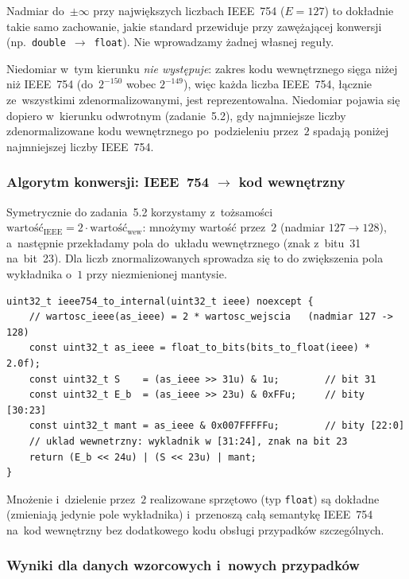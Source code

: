 \documentclass[12pt,a4paper]{article}
\begin{document}
Nadmiar do~$\pm\infty$ przy największych liczbach IEEE~754 ($E = 127$) to
dokładnie takie samo zachowanie, jakie standard przewiduje przy zawężającej
konwersji (np.\ \texttt{double}~$\to$~\texttt{float}). Nie wprowadzamy żadnej
własnej reguły.

Niedomiar w~tym kierunku \emph{nie występuje}: zakres kodu wewnętrznego sięga
niżej niż IEEE~754 (do~$2^{-150}$ wobec $2^{-149}$), więc każda liczba IEEE~754,
łącznie ze~wszystkimi zdenormalizowanymi, jest reprezentowalna. Niedomiar
pojawia się dopiero w~kierunku odwrotnym (zadanie~5.2), gdy najmniejsze liczby
zdenormalizowane kodu wewnętrznego po~podzieleniu przez~$2$ spadają poniżej
najmniejszej liczby IEEE~754.

\subsubsection*{Algorytm konwersji: IEEE~754 $\to$ kod wewnętrzny}

Symetrycznie do zadania~5.2 korzystamy z~tożsamości
$\text{wartość}_{\text{IEEE}} = 2 \cdot \text{wartość}_{\text{wew}}$:
mnożymy wartość przez~$2$ (nadmiar $127 \to 128$), a~następnie przekładamy pola
do~układu wewnętrznego (znak z~bitu~31 na~bit~23). Dla liczb znormalizowanych
sprowadza się to do zwiększenia pola wykładnika o~$1$ przy niezmienionej mantysie.

\begin{lstlisting}
uint32_t ieee754_to_internal(uint32_t ieee) noexcept {
    // wartosc_ieee(as_ieee) = 2 * wartosc_wejscia   (nadmiar 127 -> 128)
    const uint32_t as_ieee = float_to_bits(bits_to_float(ieee) * 2.0f);
    const uint32_t S    = (as_ieee >> 31u) & 1u;        // bit 31
    const uint32_t E_b  = (as_ieee >> 23u) & 0xFFu;     // bity [30:23]
    const uint32_t mant = as_ieee & 0x007FFFFFu;        // bity [22:0]
    // uklad wewnetrzny: wykladnik w [31:24], znak na bit 23
    return (E_b << 24u) | (S << 23u) | mant;
}
\end{lstlisting}

Mnożenie i~dzielenie przez~$2$ realizowane sprzętowo (typ \texttt{float}) są
dokładne (zmieniają jedynie pole wykładnika) i~przenoszą całą semantykę IEEE~754
na~kod wewnętrzny bez dodatkowego kodu obsługi przypadków szczególnych.

\subsubsection*{Wyniki dla danych wzorcowych i~nowych przypadków}
\end{document}
